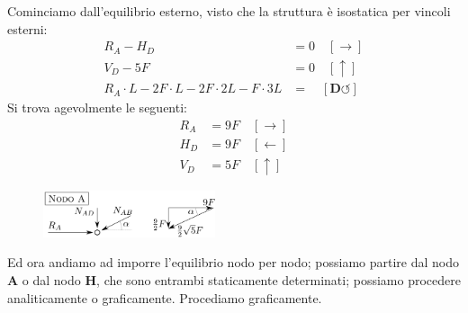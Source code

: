 \noindent Cominciamo dall'equilibrio esterno, visto che la struttura è isostatica per vincoli esterni:
\begin{align*}
R_A - H_D &= 0 \quad [\rightarrow] \\
V_D - 5F &= 0 \quad [\uparrow] \\ 
R_{A}\cdot L-2F\cdot L-2F\cdot2L - F\cdot3L &= \quad [\mathbf{D}\circlearrowleft] 
\end{align*}
\noindent Si trova agevolmente le seguenti:
\begin{align*}
R_A &= 9F \quad [\rightarrow] \\
H_D &= 9F \quad [\leftarrow] \\ 
V_D &= 5F \quad [\uparrow] 
\end{align*}
\renewcommand{\thefigure}{9.1~-~2}
\begin{figure}[ht]
\centering
\includegraphics[width=0.45\textwidth]{Immagini/Parte_9/Esercizio9_1/Esercizio9_1_2.pdf}
\caption{}
\label{Esercizio9-1-2}
\end{figure}
\noindent Ed ora andiamo ad imporre l'equilibrio nodo per nodo; possiamo partire dal nodo $\mathbf{A}$ o dal nodo $\mathbf{H}$, che sono entrambi staticamente determinati; possiamo procedere analiticamente o graficamente. Procediamo graficamente. 

